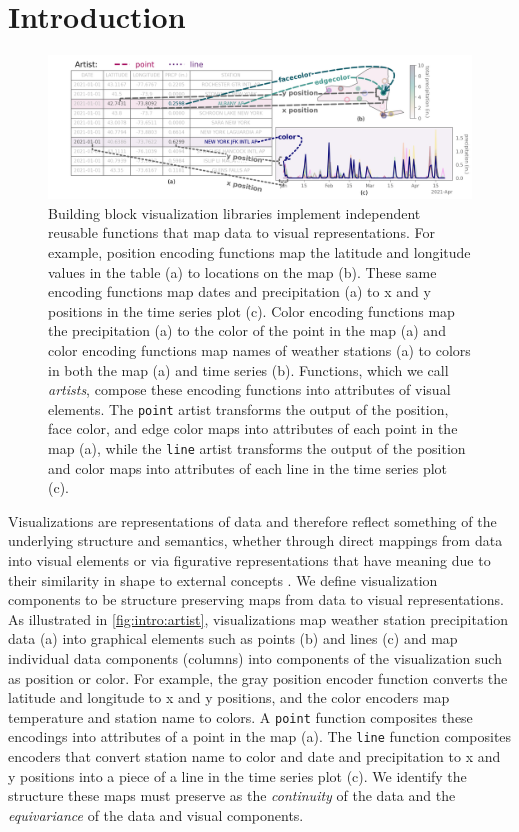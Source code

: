 \documentclass[../main.tex]{subfiles}
\begin{document}
\section{Introduction}
\label{sec:intro}
\begin{figure}[h]
    \includegraphics[width=1\textwidth]{figures/intro/functions.png}
    \caption{Building block visualization libraries implement independent reusable functions that map data to visual representations. For example, position encoding functions map the latitude and longitude values in the table (a) to locations on the map (b). These same encoding functions map dates and precipitation (a) to x and y positions in the time series plot (c). Color encoding functions map the precipitation (a) to the color of the point in the map (a) and color encoding functions map names of weather stations (a) to colors in both the map (a) and time series (b). Functions, which we call \textit{artists}, compose these encoding functions into attributes of visual elements. The \texttt{point} artist transforms the output of the position, face color, and edge color maps into attributes of each point in the map (a), while the \texttt{line} artist transforms the output of the position and color maps into attributes of each line in the time series plot (c).}
    \label{fig:intro:artist}
\end{figure}

Visualizations are representations of data and therefore reflect something of the underlying structure and semantics\cite{friendlyBriefHistoryData2008}, whether through direct mappings from data into visual elements or via figurative representations that have meaning due to their similarity in shape to external concepts \cite{byrneAcquiredCodesMeaning2016}. We define visualization components to be structure preserving maps from data to visual representations. As illustrated in \autoref{fig:intro:artist}, visualizations map weather station precipitation data (a) into graphical elements such as points (b) and lines (c) and map individual data components (columns) into components of the visualization such as position or color. For example, the gray position encoder function converts the latitude and longitude to x and y positions, and the color encoders map temperature and station name to colors. A \texttt{point} function composites these encodings into attributes of a point in the map (a). The \texttt{line} function composites encoders that convert station name to color and date and precipitation to x and y positions into a piece of a line in the time series plot (c). We identify the structure these maps must preserve as the \textit{continuity} of the data and the \textit{equivariance} of the data and visual components. 
\end{document}
